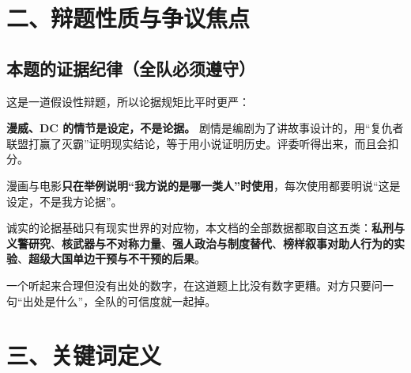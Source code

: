 \documentclass[prep,both]{debate}
\begin{document}
\section{二、辩题性质与争议焦点}
\begin{fields}
\end{fields}
\subsection{本题的证据纪律（全队必须遵守）}
这是一道假设性辩题，所以论据规矩比平时更严：

\begin{bullets}
\item \textbf{漫威、DC 的情节是设定，不是论据。} 剧情是编剧为了讲故事设计的，用“复仇者联盟打赢了灭霸”证明现实结论，等于用小说证明历史。评委听得出来，而且会扣分。
\item 漫画与电影\textbf{只在举例说明“我方说的是哪一类人”时使用}，每次使用都要明说“这是设定，不是我方论据”。
\item 诚实的论据基础只有现实世界的对应物，本文档的全部数据都取自这五类：\textbf{私刑与义警研究}、\textbf{核武器与不对称力量}、\textbf{强人政治与制度替代}、\textbf{榜样叙事对助人行为的实验}、\textbf{超级大国单边干预与不干预的后果}。
\item 一个听起来合理但没有出处的数字，在这道题上比没有数字更糟。对方只要问一句“出处是什么”，全队的可信度就一起掉。
\end{bullets}
\section{三、关键词定义}
\end{document}
